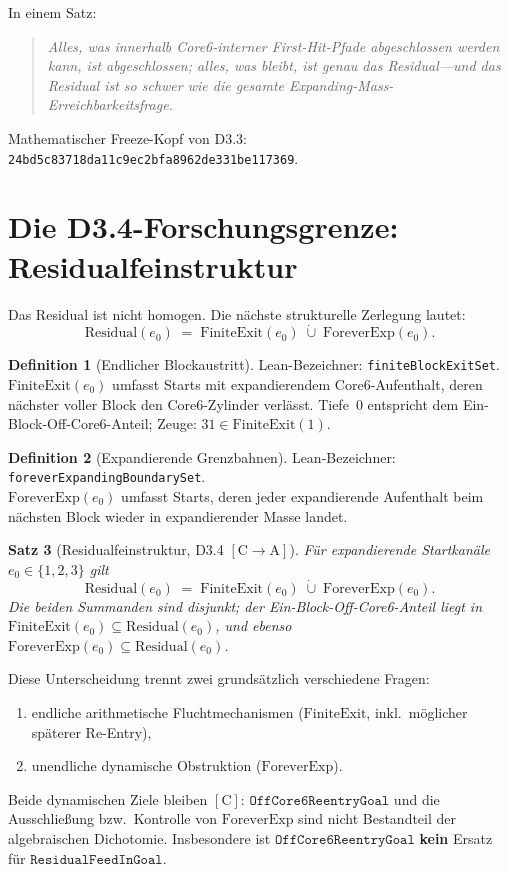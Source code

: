 \documentclass[11pt,a4paper]{article}
\newtheorem{theorem}{Satz}
\theoremstyle{definition}
\newtheorem{definition}[theorem]{Definition}
\theoremstyle{remark}
\newcommand{\CA}{\ensuremath{[\mathrm{C}\!\to\!\mathrm{A}]}}
\newcommand{\tagC}{\ensuremath{[\mathrm{C}]}}
\newcommand{\Residual}{\mathrm{Residual}}
\newcommand{\FiniteExit}{\mathrm{FiniteExit}}
\newcommand{\Forever}{\mathrm{ForeverExp}}
\begin{document}
In einem Satz:
\begin{quote}
\emph{Alles, was innerhalb Core6-interner First-Hit-Pfade abgeschlossen werden
kann, ist abgeschlossen; alles, was bleibt, ist genau das Residual---und das
Residual ist so schwer wie die gesamte Expanding-Mass-Erreichbarkeitsfrage.}
\end{quote}

Mathematischer Freeze-Kopf von D3.3:
\texttt{24bd5c83718da11c9ec2bfa8962de331be117369}.

\section{Die D3.4-Forschungsgrenze: Residualfeinstruktur}

Das Residual ist nicht homogen. Die nächste strukturelle Zerlegung lautet:
\[
  \Residual(e_0)
  \;=\;
  \FiniteExit(e_0)
  \;\dot\cup\;
  \Forever(e_0).
\]

\begin{definition}[Endlicher Blockaustritt]
Lean-Bezeichner: \texttt{finiteBlockExitSet}.\\
$\FiniteExit(e_0)$ umfasst Starts mit expandierendem Core6-Aufenthalt, deren
nächster voller Block den Core6-Zylinder verlässt.
Tiefe~$0$ entspricht dem Ein-Block-Off-Core6-Anteil; Zeuge: $31\in\FiniteExit(1)$.
\end{definition}

\begin{definition}[Expandierende Grenzbahnen]
Lean-Bezeichner: \texttt{foreverExpandingBoundarySet}.\\
$\Forever(e_0)$ umfasst Starts, deren jeder expandierende Aufenthalt beim
nächsten Block wieder in expandierender Masse landet.
\end{definition}

\begin{theorem}[Residualfeinstruktur, D3.4 \CA]
Für expandierende Startkanäle $e_0\in\{1,2,3\}$ gilt
\[
  \Residual(e_0)
  \;=\;
  \FiniteExit(e_0)
  \;\dot\cup\;
  \Forever(e_0).
\]
Die beiden Summanden sind disjunkt; der Ein-Block-Off-Core6-Anteil liegt in
$\FiniteExit(e_0)\subseteq\Residual(e_0)$, und ebenso
$\Forever(e_0)\subseteq\Residual(e_0)$.
\end{theorem}

Diese Unterscheidung trennt zwei grundsätzlich verschiedene Fragen:
\begin{enumerate}[leftmargin=*]
  \item endliche arithmetische Fluchtmechanismen
        ($\FiniteExit$, inkl.\ möglicher späterer Re-Entry),
  \item unendliche dynamische Obstruktion
        ($\Forever$).
\end{enumerate}
Beide dynamischen Ziele bleiben \tagC:
$\mathtt{OffCore6ReentryGoal}$ und die Ausschließung bzw.\ Kontrolle von
$\Forever$ sind nicht Bestandteil der algebraischen Dichotomie.
Insbesondere ist $\mathtt{OffCore6ReentryGoal}$ \textbf{kein} Ersatz für
$\mathtt{ResidualFeedInGoal}$.
\end{document}
